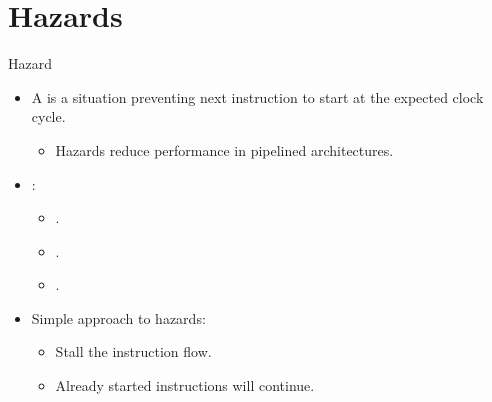 \section{Hazards}

\begin{frame}[t]{Hazard}
\begin{itemize}
  \item A  is a situation preventing next
        instruction to start at the expected clock cycle.
    \begin{itemize}
      \item Hazards reduce performance in pipelined architectures.
    \end{itemize}

  \item {}:
    \begin{itemize}
      \item {}.
      \item {}.
      \item {}.
    \end{itemize}

  \item Simple approach to hazards:
    \begin{itemize}
      \item Stall the instruction flow.
      \item Already started instructions will continue.
    \end{itemize}
\end{itemize}
\end{frame}

